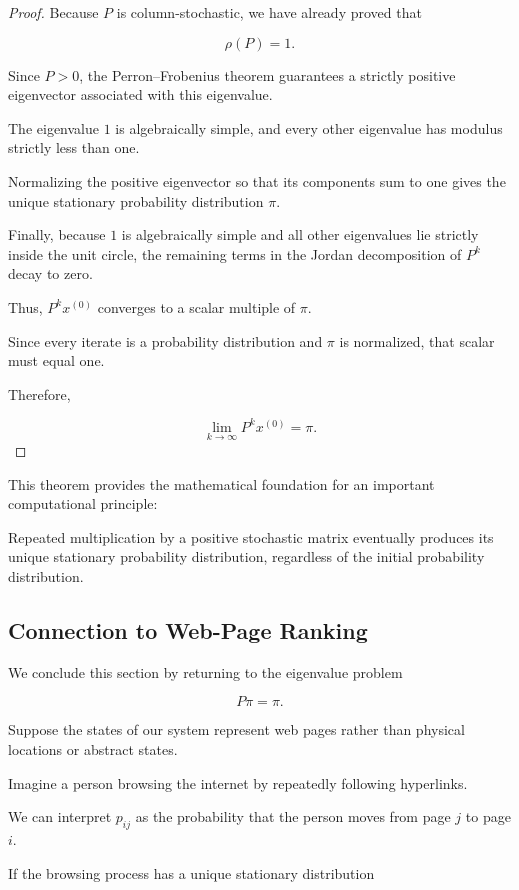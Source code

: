 \documentclass[11pt,a4paper]{article}
\theoremstyle{definition}
\theoremstyle{remark}
\begin{document}
\begin{proof}

Because $P$ is column-stochastic,
we have already proved that

\[
\rho(P)=1.
\]

Since $P>0$, the
Perron--Frobenius theorem
guarantees a strictly positive
eigenvector associated with
this eigenvalue.

The eigenvalue $1$
is algebraically simple,
and every other eigenvalue
has modulus strictly
less than one.

Normalizing the positive
eigenvector so that its
components sum to one
gives the unique stationary
probability distribution $\pi$.

Finally, because $1$
is algebraically simple
and all other eigenvalues
lie strictly inside the
unit circle, the remaining
terms in the Jordan
decomposition of $P^k$
decay to zero.

Thus, $P^kx^{(0)}$
converges to a scalar
multiple of $\pi$.

Since every iterate is
a probability distribution
and $\pi$ is normalized,
that scalar must equal one.

Therefore,

\[
\boxed{
\lim_{k\to\infty}
P^kx^{(0)}=\pi.
}
\]

\end{proof}

This theorem provides the
mathematical foundation
for an important
computational principle:

Repeated multiplication
by a positive stochastic
matrix eventually produces
its unique stationary
probability distribution,
regardless of the initial
probability distribution.

\subsection{Connection to Web-Page Ranking}

We conclude this section
by returning to the
eigenvalue problem

\[
P\pi=\pi.
\]

Suppose the states of our
system represent web pages
rather than physical
locations or abstract states.

Imagine a person browsing
the internet by repeatedly
following hyperlinks.

We can interpret $p_{ij}$
as the probability that
the person moves from
page $j$ to page $i$.

If the browsing process
has a unique stationary
distribution
\end{document}
